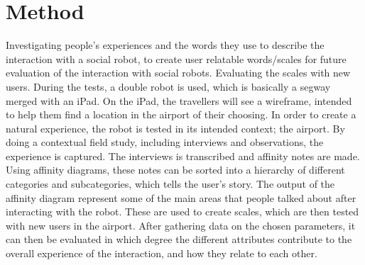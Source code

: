\section{Method}
\label{Method}

Investigating people's experiences and the words they use to describe the interaction with a social robot, to create user relatable words/scales for future evaluation of the interaction with social robots. Evaluating the scales with new users.
During the tests, a double robot is used, which is basically a segway merged with an iPad. On the iPad, the travellers will see a wireframe, intended to help them find a location in the airport of their choosing.
In order to create a natural experience, the robot is tested in its intended context; the airport. By doing a contextual field study, including interviews and observations, the experience is captured. The interviews is transcribed and affinity notes are made. Using affinity diagrams, these notes can be sorted into a hierarchy of different categories and subcategories, which tells the user’s story.
The output of the affinity diagram represent some of the main areas that people talked about after interacting with the robot. These are used to create scales, which are then tested with new users in the airport. After gathering data on the chosen parameters, it can then be evaluated in which degree the different attributes contribute to the overall experience of the interaction, and how they relate to each other.